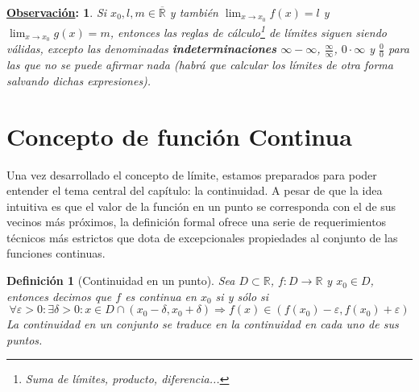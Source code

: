 \documentclass[10pt,a4paper,openright]{book}
\theoremstyle{break}
\newtheorem*{defi}{Definición}
\newtheorem*{obs}{\underline{Observación}:}
\begin{document}
\begin{obs}
Si $x_0,l,m\in \overline{\mathbb R}$ y también $\lim_{x\rightarrow x_0}f(x)=l$ y $\lim_{x\rightarrow x_0}g(x)=m$, entonces las reglas de cálculo\footnote{Suma de límites, producto, diferencia...} de límites siguen siendo válidas, excepto las denominadas \textbf{indeterminaciones} $\infty-\infty$, $\frac{\infty}{\infty}$, $0\cdot \infty$ y $\frac{0}{0}$ para las que no se puede afirmar nada (habrá que calcular los límites de otra forma salvando dichas expresiones).
\end{obs}

\section{Concepto de función Continua}
Una vez desarrollado el concepto de límite, estamos preparados para poder entender el tema central del capítulo: la continuidad. A pesar de que la idea intuitiva es que el valor de la función en un punto se corresponda con el de sus vecinos más próximos, la definición formal ofrece una serie de requerimientos técnicos más estrictos que dota de excepcionales propiedades al conjunto de las funciones continuas.

\begin{defi}[Continuidad en un punto]
Sea $D\subset \mathbb R$, $f: D\longrightarrow \mathbb R$ y $x_0\in D$, entonces decimos que $f$ es continua en $x_0$ si y sólo si
$$\forall \varepsilon >0 : \exists \delta >0: x\in D\cap (x_0-\delta, x_0+\delta)\Rightarrow f(x)\in (f(x_0)-\varepsilon, f(x_0)+\varepsilon)$$
La continuidad en un conjunto se traduce en la continuidad en cada uno de sus puntos.
\end{defi}
\end{document}
